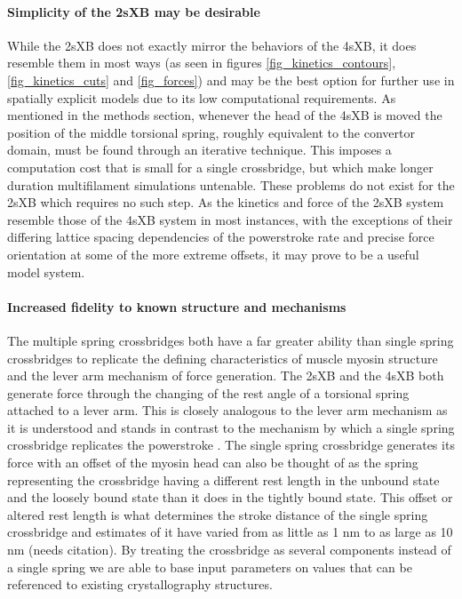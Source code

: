 \documentclass[]{article}
\begin{document}
\paragraph{Simplicity of the 2sXB may be desirable} %
While the 2sXB does not exactly mirror the behaviors of the 4sXB, it does resemble them in most ways (as seen in figures \ref{fig_kinetics_contours}, \ref{fig_kinetics_cuts} and \ref{fig_forces}) and may be the best option for further use in spatially explicit models due to its low computational requirements.
As mentioned in the methods section, whenever the head of the 4sXB is moved the position of the middle torsional spring, roughly equivalent to the convertor domain, must be found through an iterative technique. 
This imposes a computation cost that is small for a single crossbridge, but which make longer duration multifilament simulations untenable. 
These problems do not exist for the 2sXB which requires no such step.
As the kinetics and force of the 2sXB system resemble those of the 4sXB system in most instances, with the exceptions of their differing lattice spacing dependencies of the powerstroke rate and precise force orientation at some of the more extreme offsets, it may prove to be a useful model system.

\paragraph{Increased fidelity to known structure and mechanisms} %
The multiple spring crossbridges both have a far greater ability than single spring crossbridges to replicate the defining characteristics of muscle myosin structure and the lever arm mechanism of force generation. 
The 2sXB and the 4sXB both generate force through the changing of the rest angle of a torsional spring attached to a lever arm.
This is closely analogous to the lever arm mechanism as it is understood and stands in contrast to the mechanism by which a single spring crossbridge replicates the powerstroke \citep{Houdusse:2001:p182}.
The single spring crossbridge generates its force with an offset of the myosin head can also be thought of as the spring representing the crossbridge having a different rest length in the unbound state and the loosely bound state than it does in the tightly bound state. 
This offset or altered rest length is what determines the stroke distance of the single spring crossbridge and estimates of it have varied from as little as 1 nm to as large as 10 nm (needs citation). 
By treating the crossbridge as several components instead of a single spring we are able to base input parameters on values that can be referenced to existing crystallography structures.
\end{document}

